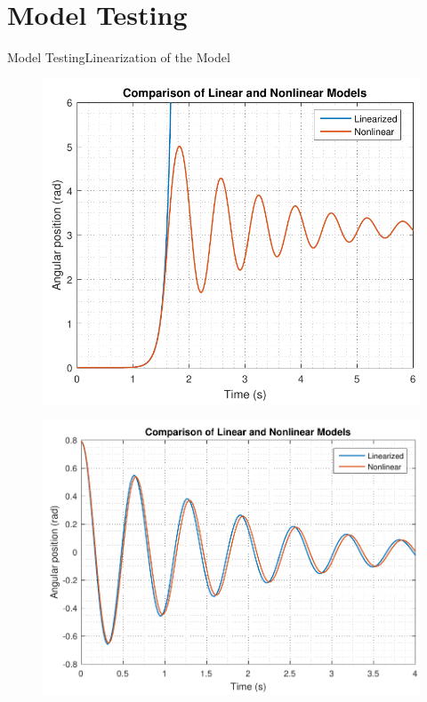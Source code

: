 \section{Model Testing}
\begin{frame}{Model Testing}{Linearization of the Model}
  \begin{minipage}{\linewidth}\centering
    \begin{minipage}{0.45\linewidth}
      \begin{figure}[H]
        \centering
        \includegraphics[scale=0.33]{Pictures/LinearizedVSNonlinear}
      \end{figure}
    \end{minipage}
    \begin{minipage}{0.45\linewidth}
      \begin{figure}[H]
        \centering
        \includegraphics[scale=0.33]{Pictures/LinearizedVSNonlinear_0}
      \end{figure}
    \end{minipage}
  \end{minipage}
\end{frame}

